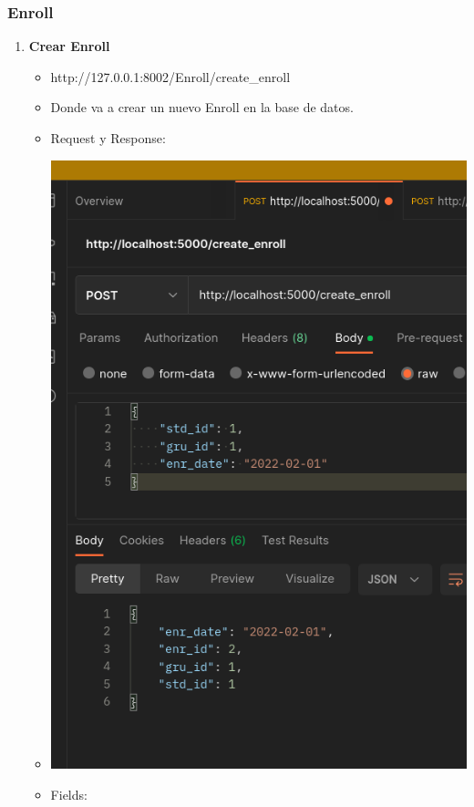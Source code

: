 \documentclass{article}
\begin{document}
\subsubsection{Enroll}
\begin{enumerate}
    \item \textbf{Crear Enroll}
    \begin{itemize}
        \item http://127.0.0.1:8002/Enroll/create\_enroll
        \item Donde va a crear un nuevo Enroll en la base de datos.
        \item Request y Response:
        \item \includegraphics[scale=.5]{assets/enroll/create.png}
        \item Fields:
        \begin{table}[H] \centering \begin{tabular}{|l|l|l|l|} \hline

\end{tabular}
\end{table}
\end{itemize}
\end{enumerate}
\end{document}
